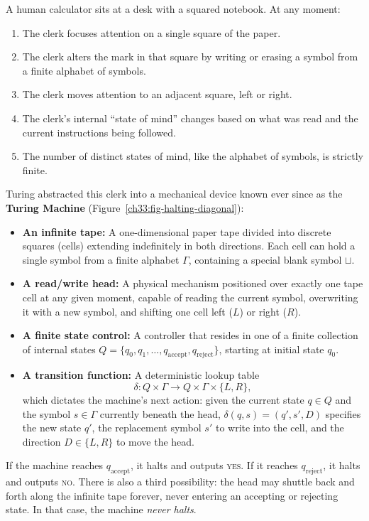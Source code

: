 A human calculator sits at a desk with a squared notebook. At any moment:
\begin{enumerate}
  \item The clerk focuses attention on a single square of the paper.
  \item The clerk alters the mark in that square by writing or erasing a symbol from a finite alphabet of symbols.
  \item The clerk moves attention to an adjacent square, left or right.
  \item The clerk's internal ``state of mind'' changes based on what was read and the current instructions being followed.
  \item The number of distinct states of mind, like the alphabet of symbols, is strictly finite.
\end{enumerate}

Turing abstracted this clerk into a mechanical device known ever since as the \textbf{Turing Machine} (Figure~\ref{ch33:fig-halting-diagonal}):
\begin{itemize}
  \item \textbf{An infinite tape:} A one-dimensional paper tape divided into discrete squares (cells) extending indefinitely in both directions. Each cell can hold a single symbol from a finite alphabet $\Gamma$, containing a special blank symbol $\sqcup$.
  \item \textbf{A read/write head:} A physical mechanism positioned over exactly one tape cell at any given moment, capable of reading the current symbol, overwriting it with a new symbol, and shifting one cell left ($L$) or right ($R$).
  \item \textbf{A finite state control:} A controller that resides in one of a finite collection of internal states $Q = \{q_0, q_1, \dots, q_{\text{accept}}, q_{\text{reject}}\}$, starting at initial state $q_0$.
  \item \textbf{A transition function:} A deterministic lookup table
  \[
    \delta : Q \times \Gamma \to Q \times \Gamma \times \{L, R\},
  \]
  which dictates the machine's next action: given the current state $q \in Q$ and the symbol $s \in \Gamma$ currently beneath the head, $\delta(q, s) = (q', s', D)$ specifies the new state $q'$, the replacement symbol $s'$ to write into the cell, and the direction $D \in \{L, R\}$ to move the head.
\end{itemize}

If the machine reaches $q_{\text{accept}}$, it halts and outputs \textsc{yes}. If it reaches $q_{\text{reject}}$, it halts and outputs \textsc{no}. There is also a third possibility: the head may shuttle back and forth along the infinite tape forever, never entering an accepting or rejecting state. In that case, the machine \emph{never halts}.


